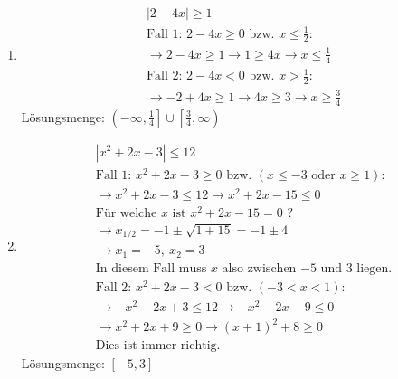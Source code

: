 \begin{enumerate}[label=\alph*)]
  \item \begin{align*}
      &\left|2 - 4x\right| \geq 1\\
      &\text{Fall 1: } 2 - 4x \geq 0 \text{ bzw. } x \leq \tfrac{1}{2}:\\
      &\rightarrow 2 - 4x \geq 1 \rightarrow 1 \geq 4x \rightarrow x \leq \tfrac{1}{4}\\
      &\text{Fall 2: } 2 - 4x < 0 \text{ bzw. } x > \tfrac{1}{2}:\\
      &\rightarrow -2 + 4x \geq 1 \rightarrow 4x \geq 3 \rightarrow x \geq \tfrac{3}{4}
    \end{align*}
    Lösungsmenge: $\left(-\infty, \tfrac{1}{4}\right] \cup \left[\tfrac{3}{4}, \infty\right)$
  \item \begin{align*}
      &\left|x^2 + 2x - 3\right| \leq 12\\
      &\text{Fall 1: } x^2 + 2x - 3 \geq 0 \text{ bzw. } (x \leq -3 \text{ oder } x \geq 1):\\
      &\rightarrow x^2 + 2x - 3 \leq 12 \rightarrow x^2 + 2x - 15 \leq 0\\
      &\text{Für welche } x \text{ ist } x^2 + 2x - 15 = 0 \text{ ?}\\
      &\rightarrow x_{1/2} = -1 \pm \sqrt{1 + 15} = -1 \pm 4\\
      &\rightarrow x_1 = -5,\ x_2 = 3\\
      &\text{In diesem Fall muss $x$ also zwischen $-5$ und $3$ liegen.}\\
      &\text{Fall 2: } x^2 + 2x - 3 < 0 \text{ bzw. } (-3 < x < 1):\\
      &\rightarrow -x^2 - 2x + 3 \leq 12 \rightarrow -x^2 - 2x - 9 \leq 0\\
      &\rightarrow x^2 + 2x + 9 \geq 0 \rightarrow (x+1)^2 + 8 \geq 0\\
      &\text{Dies ist immer richtig.}
    \end{align*}
    Lösungsmenge: $[-5, 3]$
\end{enumerate}

